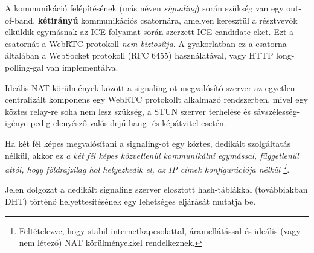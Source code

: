 A kommunikáció felépítésének (más néven \emph{signaling}) során szükség van egy out-of-band, \textbf{kétirányú}
kommunikációs csatornára, amelyen keresztül a résztvevők elküldik egymásnak az ICE folyamat során szerzett ICE candidate-eket.
Ezt a csatornát a WebRTC protokoll \emph{nem biztosítja}.
A gyakorlatban ez a csatorna általában a WebSocket protokoll (RFC 6455\cite{WebSocket}) használatával, vagy HTTP long-polling-gal van
implementálva.

Ideális NAT körülmények között a signaling-ot megvalósító szerver az egyetlen centralizált komponens egy WebRTC protokollt
alkalmazó rendszerben, mivel egy köztes relay-re soha nem lesz szükség, a STUN szerver terhelése és sávszélesség-igénye
pedig elenyésző valósidejű hang- és képátvitel esetén.

Ha két fél képes megvalósítani a signaling-ot egy köztes, dedikált szolgáltatás nélkül, akkor ez \emph{a két fél képes közvetlenül
kommunikálni egymással, függetlenül attól, hogy földrajzilag hol helyezkedik el, az IP címek konfigurációja nélkül
\footnote{Feltételezve, hogy stabil internetkapcsolattal, áramellátással és ideális (vagy nem létező) NAT körülményekkel rendelkeznek.}}.

Jelen dolgozat a dedikált signaling szerver elosztott hash-táblákkal (továbbiakban DHT) történő helyettesítésének egy
lehetséges eljárását mutatja be.
